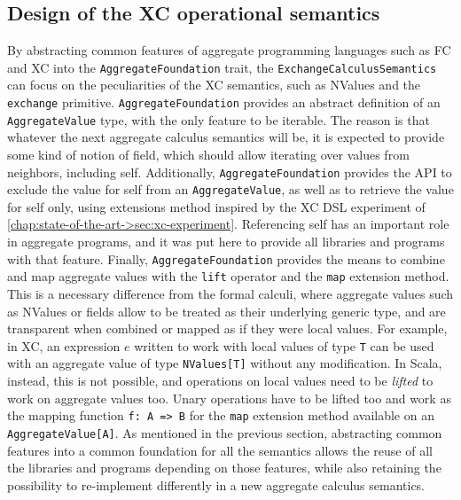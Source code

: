 \subsection{Design of the XC operational semantics} \label{chap:design->sec:final-dsl->subsec:exchange-calculus-semantics-design}

By abstracting common features of aggregate programming languages such as \ac{FC} and \ac{XC} into the \texttt{AggregateFoundation} trait, the \texttt{ExchangeCalculusSemantics} can focus on the peculiarities of the \ac{XC} semantics, such as NValues and the \texttt{exchange} primitive.
%
\texttt{AggregateFoundation} provides an abstract definition of an \texttt{AggregateValue} type, with the only feature to be iterable.
%
The reason is that whatever the next aggregate calculus semantics will be, it is expected to provide some kind of notion of field, which should allow iterating over values from neighbors, including self.
%
Additionally, \texttt{AggregateFoundation} provides the \ac{API} to exclude the value for self from an \texttt{AggregateValue}, as well as to retrieve the value for self only, using extensions method inspired by the \ac{XC} \ac{DSL} experiment of \cref{chap:state-of-the-art->sec:xc-experiment}.
%
Referencing self has an important role in aggregate programs, and it was put here to provide all libraries and programs with that feature.
%
Finally, \texttt{AggregateFoundation} provides the means to combine and map aggregate values with the \texttt{lift} operator and the \texttt{map} extension method.
%
This is a necessary difference from the formal calculi, where aggregate values such as NValues or fields allow to be treated as their underlying generic type, and are transparent when combined or mapped as if they were local values.
%
For example, in \ac{XC}, an expression $e$ written to work with local values of type \texttt{T} can be used with an aggregate value of type \texttt{NValues[T]} without any modification.
%
In Scala, instead, this is not possible, and operations on local values need to be \textit{lifted} to work on aggregate values too.
%
Unary operations have to be lifted too and work as the mapping function \texttt{f: A => B} for the \texttt{map} extension method available on an \texttt{AggregateValue[A]}.
%
As mentioned in the previous section, abstracting common features into a common foundation for all the semantics allows the reuse of all the libraries and programs depending on those features, while also retaining the possibility to re-implement differently in a new aggregate calculus semantics.

